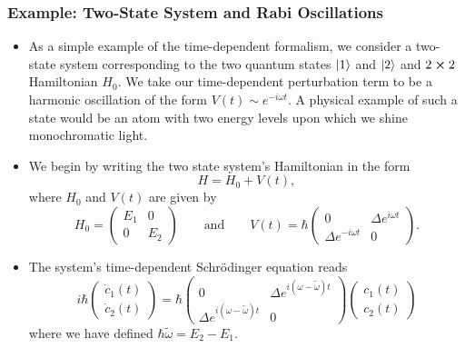\documentclass[11pt, a4paper]{article}
\newcommand{\Schro}{Schr\"{o}dinger\xspace}
\begin{document}
\subsubsection{Example: Two-State System and Rabi Oscillations}
\begin{itemize}
    \item As a simple example of the time-dependent formalism, we consider a two-state system corresponding to the two quantum states $ \ket{1} $ and $ \ket{2} $ and  $ 2\cross 2 $ Hamiltonian $ H_{0} $. We take our time-dependent perturbation term to be a harmonic oscillation of the form $ V(t) \sim e^{-i\omega t} $. A physical example of such a state would be an atom with two energy levels upon which we shine monochromatic light.

    \item We begin by writing the two state system's Hamiltonian in the form
    \begin{equation*}
        H = H_{0} + V(t),
    \end{equation*}
    where $ H_{0} $ and $ V(t) $ are given by
    \begin{equation*}
        H_{0} = 
        \begin{pmatrix}
            E_{1} & 0\\
            0 & E_{2}
        \end{pmatrix}
        \qquad \text{and} \qquad 
        V(t) = \hbar
        \begin{pmatrix}
            0 & \Delta e^{i\omega t}\\
            \Delta e^{-i\omega t} & 0
        \end{pmatrix}.
    \end{equation*}

    \item The system's time-dependent \Schro equation reads
    \begin{equation*}
        i \hbar 
        \begin{pmatrix}
            \dot{c}_{1}(t)\\
            \dot{c}_{2}(t)
        \end{pmatrix}
        = \hbar
        \begin{pmatrix}
            0 & \Delta e^{i(\omega - \tilde{\omega})t}\\
            \Delta e^{i(\omega - \tilde{\omega})t} & 0
        \end{pmatrix}
        \begin{pmatrix}
            c_{1}(t)\\
            c_{2}(t)
        \end{pmatrix}
    \end{equation*}
    where we have defined $ \hbar \tilde{\omega} = E_{2} - E_{1} $.
    

\end{itemize}
\end{document}
